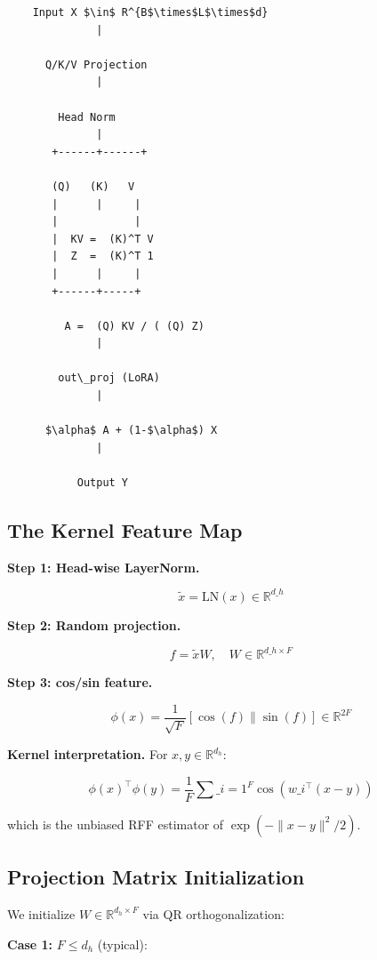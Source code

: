 \begin{lstlisting}
    Input X $\in$ R^{B$\times$L$\times$d}
              |
               
      Q/K/V Projection
              |
               
        Head Norm
              |
       +------+------+
                      
       (Q)   (K)   V
       |      |     |
       |            |
       |  KV =  (K)^T V
       |  Z  =  (K)^T 1
       |      |     |
       +------+-----+
               
         A =  (Q) KV / ( (Q) Z)
              |
               
        out\_proj (LoRA)
              |
               
      $\alpha$ A + (1-$\alpha$) X
              |
               
           Output Y
\end{lstlisting}

\subsection{The Kernel Feature Map}

\textbf{Step 1: Head-wise LayerNorm.}

\[
\tilde{x} = \text{LN}(x) \in \mathbb{R}^{d\_h}
\tag{4.1}
\]

\textbf{Step 2: Random projection.}

\[
f = \tilde{x} W, \quad W \in \mathbb{R}^{d\_h \times F}
\tag{4.2}
\]

\textbf{Step 3: cos/sin feature.}

\[
\phi(x) = \frac{1}{\sqrt{F}} [\cos(f) \| \sin(f)] \in \mathbb{R}^{2F}
\tag{4.3}
\]

\textbf{Kernel interpretation.} For $x, y \in \mathbb{R}^{d_h}$:

\[
\phi(x)^\top \phi(y) = \frac{1}{F} \sum\_{i=1}^F \cos(w\_i^\top (x - y))
\tag{4.4}
\]

which is the unbiased RFF estimator of $\exp(-\|x - y\|^2 / 2)$.

\subsection{Projection Matrix Initialization}

We initialize $W \in \mathbb{R}^{d_h \times F}$ via QR orthogonalization:

\textbf{Case 1:} $F \leq d_h$ (typical):

